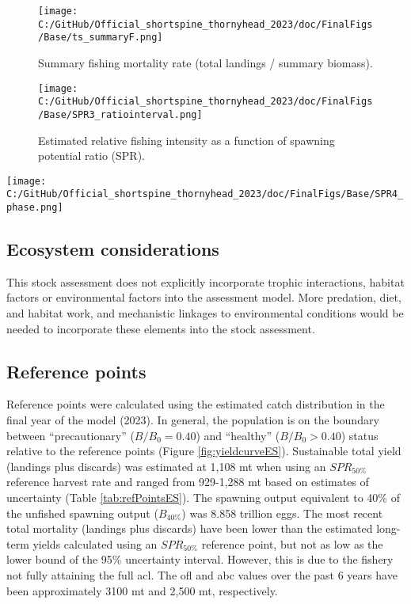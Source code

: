 \documentclass[11pt,
  letterpaper,
]{article}
\begin{document}
\begin{figure}
\centering
\texttt{[image: C:/GitHub/Official\_shortspine\_thornyhead\_2023/doc/FinalFigs/Base/ts\_summaryF.png]}
\caption{Summary fishing mortality rate (total landings / summary biomass).\label{fig:summary_fES}}
\end{figure}

\begin{figure}
\centering
\texttt{[image: C:/GitHub/Official\_shortspine\_thornyhead\_2023/doc/FinalFigs/Base/SPR3\_ratiointerval.png]}
\caption{Estimated relative fishing intensity as a function of spawning potential ratio (SPR).\label{fig:spr_trajectoryES}}
\end{figure}

\texttt{[image: C:/GitHub/Official\_shortspine\_thornyhead\_2023/doc/FinalFigs/Base/SPR4\_phase.png]} \clearpage

\hypertarget{ecosystem-considerations}{%
\subsection*{Ecosystem considerations}\label{ecosystem-considerations}}

This stock assessment does not explicitly incorporate trophic interactions, habitat factors or environmental factors into the assessment model. More predation, diet, and habitat work, and mechanistic linkages to environmental conditions would be needed to incorporate these elements into the stock assessment.

\hypertarget{reference-points}{%
\subsection*{Reference points}\label{reference-points}}

Reference points were calculated using the estimated catch distribution in the final year of the model (2023). In general, the population is on the boundary between ``precautionary'' (\(B/B_0 = 0.40\)) and ``healthy'' (\(B/B_0 > 0.40\)) status relative to the reference points (Figure \ref{fig:yieldcurveES}). Sustainable total yield (landings plus discards) was estimated at 1,108 mt when using an \(SPR_{50\%}\) reference harvest rate and ranged from 929-1,288 mt based on estimates of uncertainty (Table \ref{tab:refPointsES}). The spawning output equivalent to 40\% of the unfished spawning output (\(B_{40\%}\)) was 8.858 trillion eggs. The most recent total mortality (landings plus discards) have been lower than the estimated long-term yields calculated using an \(SPR_{50\%}\) reference point, but not as low as the lower bound of the 95\% uncertainty interval. However, this is due to the fishery not fully attaining the full \gls{acl}. The \gls{ofl} and \gls{abc} values over the past 6 years have been approximately 3100 mt and 2,500 mt, respectively.
\end{document}

